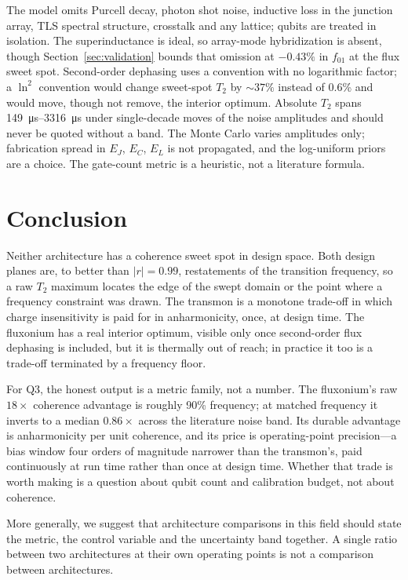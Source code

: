 \documentclass[journal]{IEEEtran}
\begin{document}
The model omits Purcell decay, photon shot noise, inductive loss in the junction array, TLS
spectral structure, crosstalk and any lattice; qubits are treated in isolation. The
superinductance is ideal, so array-mode hybridization is absent, though
Section~\ref{sec:validation} bounds that omission at $-0.43\%$ in $f_{01}$ at the flux sweet
spot. Second-order dephasing uses a convention with no logarithmic factor; a $\ln^2$
convention would change sweet-spot $T_2$ by ${\sim}37\%$ instead of 0.6\% and would move,
though not remove, the interior optimum. Absolute $T_2$ spans
\SIrange{149}{3316}{\micro\second} under single-decade moves of the noise amplitudes and
should never be quoted without a band. The Monte Carlo varies amplitudes only; fabrication
spread in $E_J$, $E_C$, $E_L$ is not propagated, and the log-uniform priors are a choice. The
gate-count metric is a heuristic, not a literature formula.

\section{Conclusion}

Neither architecture has a coherence sweet spot in design space. Both design planes are, to
better than $|r| = 0.99$, restatements of the transition frequency, so a raw $T_2$ maximum
locates the edge of the swept domain or the point where a frequency constraint was drawn.
The transmon is a monotone trade-off in which charge insensitivity is paid for in
anharmonicity, once, at design time. The fluxonium has a real interior optimum, visible only
once second-order flux dephasing is included, but it is thermally out of reach; in practice
it too is a trade-off terminated by a frequency floor.

For Q3, the honest output is a metric family, not a number. The fluxonium's raw $18\times$
coherence advantage is roughly 90\% frequency; at matched frequency it inverts to a median
$0.86\times$ across the literature noise band. Its durable advantage is anharmonicity per
unit coherence, and its price is operating-point precision---a bias window four orders of
magnitude narrower than the transmon's, paid continuously at run time rather than once at
design time. Whether that trade is worth making is a question about qubit count and
calibration budget, not about coherence.

More generally, we suggest that architecture comparisons in this field should state the
metric, the control variable and the uncertainty band together. A single ratio between two
architectures at their own operating points is not a comparison between architectures.
\end{document}
